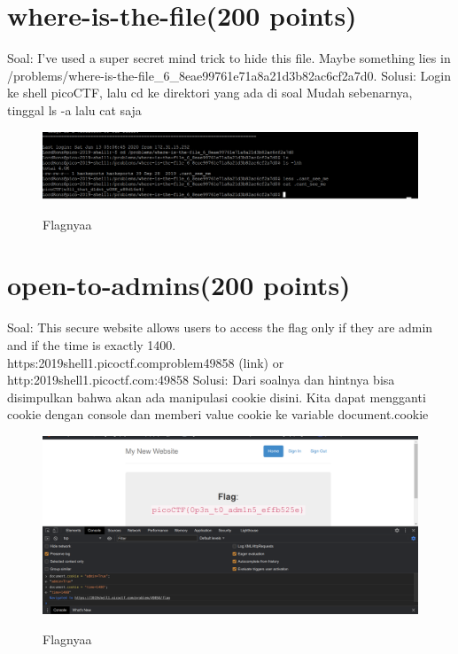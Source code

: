 \documentclass[a4paper,12pt]{article}
\begin{document}
\section{\textbf{where-is-the-file(200 points)}}
Soal: I've used a super secret mind trick to hide this file. Maybe something lies in /problems/where-is-the-file\_6\_8eae99761e71a8a21d3b82ac6cf2a7d0.
Solusi:
Login ke shell picoCTF, lalu cd ke direktori yang ada di soal
Mudah sebenarnya, tinggal ls -a lalu cat saja
\begin{figure}[H]
 \centering
\includegraphics[width=1\textwidth]{wherefileflag.png}\\
\caption{Flagnyaa}
\end{figure}
\vspace{1cm}
\section{\textbf{open-to-admins(200 points)}}
Soal: This secure website allows users to access the flag only if they are admin and if the time is exactly 1400.\\ https:\/\/2019shell1.picoctf.com\/problem\/49858\/ (link) or http:\/\/2019shell1.picoctf.com:49858
Solusi: Dari soalnya dan hintnya bisa disimpulkan bahwa akan ada manipulasi cookie disini. Kita dapat mengganti cookie dengan console dan memberi value cookie ke variable document.cookie
\begin{figure}[H]
 \centering
\includegraphics[width=1\textwidth]{opentoadminsflag.png}\\
\caption{Flagnyaa}
\end{figure}
\vspace{1cm}
\end{document}
